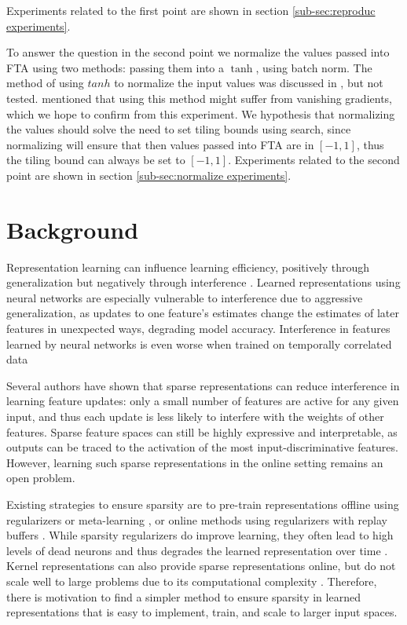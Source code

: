 \documentclass{article}
\begin{document}
Experiments related to the first point are shown in section \ref{sub-sec:reproduc experiments}. 

To answer the question in the second point we normalize the values passed into FTA using two methods: passing them into a $\tanh$, using batch norm.
The method of using $tanh$ to normalize the input values was discussed in \cite{pan2019fuzzy}, but not tested.
\cite{pan2019fuzzy} mentioned that using this method might suffer from vanishing gradients, which we hope to confirm from this experiment.
We hypothesis that normalizing the values should solve the need to set tiling bounds using search, since normalizing will ensure that then values passed into FTA are in $[-1, 1]$, thus the tiling bound can always be set to $[-1, 1]$.
Experiments related to the second point are shown in section \ref{sub-sec:normalize experiments}. 


\section{Background} \label{sec:background}
Representation learning can influence learning efficiency, positively through generalization but negatively through interference \cite[]{bullinaria1995, iCaRL2016, le2017, liu2019}.
Learned representations using neural networks are especially vulnerable to interference due to aggressive generalization, as updates to one feature’s estimates change the estimates of later features in unexpected ways, degrading model accuracy. 
Interference in features learned by neural networks is even worse when trained on temporally correlated data \cite[]{liu2020, bengio2020, zhang2022}

Several authors \cite[]{ghiassian2020,liu2019,javed2019,sutton2019}
have shown that sparse representations can reduce interference in learning feature updates: only a small number of features are active for any given input, 
and thus each update is less likely to interfere with the weights of other features. Sparse feature spaces can still be highly expressive and interpretable, 
as outputs can be traced to the activation of the most input-discriminative features. 
However, learning such sparse representations in the online setting remains an open problem.

Existing strategies to ensure sparsity are to pre-train representations offline using regularizers \cite[]{liu2019} or meta-learning \cite{javed2019}, 
or online methods using regularizers with replay buffers \cite{sutton2019}. While sparsity regularizers do improve learning, 
they often lead to high levels of dead neurons and thus degrades the learned representation over time \cite[]{sutton2019}. 
Kernel representations can also provide sparse representations online, but do not scale well to large problems due to its computational complexity \cite[]{pan2019fuzzy}. 
Therefore, there is motivation to find a simpler method to ensure sparsity in learned representations that is easy to implement, train, and scale to larger input spaces.
\end{document}
